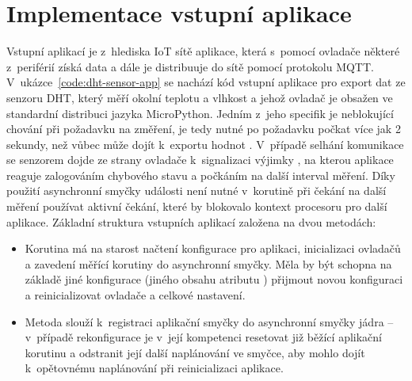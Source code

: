 \section{Implementace vstupní aplikace}\label{sec:implementace-vstupni-aplikace}
Vstupní aplikací je z~hlediska IoT sítě aplikace, která s~pomocí ovladače některé z~periférií získá data a dále je
distribuuje do sítě pomocí protokolu MQTT.
V~ukázce~\ref{code:dht-sensor-app} se nachází kód vstupní aplikace pro export dat ze senzoru DHT, který měří okolní
teplotu a vlhkost a jehož ovladač je obsažen ve standardní distribuci jazyka MicroPython.
Jedním z~jeho specifik je neblokující chování při požadavku na změření, je tedy nutné po požadavku počkat
více jak 2 sekundy, než vůbec může dojít k~exportu hodnot \cite{dht22}.
V~případě selhání komunikace se senzorem dojde ze strany ovladače k~signalizaci výjimky , na kterou aplikace
reaguje zalogováním chybového stavu a počkáním na další interval měření.
Díky použití asynchronní smyčky události není nutné v~korutině  při čekání na další měření
používat aktivní čekání, které by blokovalo kontext procesoru pro další aplikace.
Základní struktura vstupních aplikací založena na dvou metodách:
\begin{itemize}
    \item Korutina  má na starost načtení konfigurace pro aplikaci, inicializaci ovladačů a zavedení
    měřící korutiny do asynchronní smyčky. Měla by být schopna na základě jiné konfigurace (jiného obsahu atributu
    ) přijmout novou konfiguraci a reinicializovat ovladače a celkové nastavení.
    \item Metoda  slouží k~registraci aplikační smyčky do asynchronní smyčky jádra -- v~případě
    rekonfigurace je v~její kompetenci resetovat již běžící aplikační korutinu a odstranit její další naplánování ve
    smyčce, aby mohlo dojít k~opětovnému naplánování při reinicializaci aplikace.
\end{itemize}

